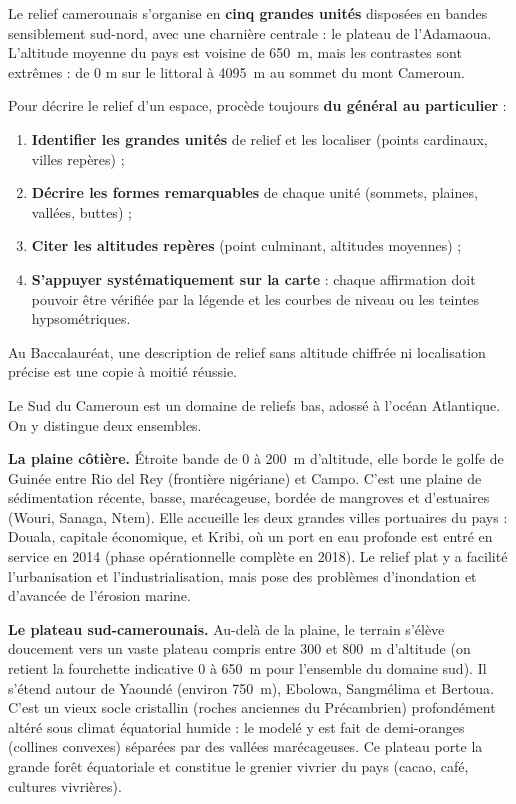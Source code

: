 \documentclass[11pt]{article}
\newcommand{\cle}[1]{{\popxbold\color{popdark}#1}}
\newcounter{popsec}
\newcounter{popsub}
\newcommand{\courssub}[1]{%
  \stepcounter{popsub}%
  \par\vspace{9pt}\noindent{\popxbold\fontsize{11.5}{13}\selectfont\color{popink}{\color{poporange}\thepopsec.\thepopsub}\hspace{6pt}#1}\par\nopagebreak\vspace{4pt}
}
\begin{document}
Le relief camerounais s'organise en \textbf{cinq grandes unités} disposées en bandes sensiblement sud-nord, avec une charnière centrale : le plateau de l'Adamaoua. L'altitude moyenne du pays est voisine de \SI{650}{m}, mais les contrastes sont extrêmes : de 0 m sur le littoral à \SI{4095}{m} au sommet du mont Cameroun.

\begin{methode}
Pour décrire le relief d'un espace, procède toujours \textbf{du général au particulier} :
\begin{enumerate}
\item \textbf{Identifier les grandes unités} de relief et les localiser (points cardinaux, villes repères) ;
\item \textbf{Décrire les formes remarquables} de chaque unité (sommets, plaines, vallées, buttes) ;
\item \textbf{Citer les altitudes repères} (point culminant, altitudes moyennes) ;
\item \textbf{S'appuyer systématiquement sur la carte} : chaque affirmation doit pouvoir être vérifiée par la légende et les courbes de niveau ou les teintes hypsométriques.
\end{enumerate}
Au Baccalauréat, une description de relief sans altitude chiffrée ni localisation précise est une copie à moitié réussie.
\end{methode}

\courssub{Les plaines et bas plateaux du Sud (0 à 650 m)}

Le Sud du Cameroun est un domaine de \cle{reliefs bas}, adossé à l'océan Atlantique. On y distingue deux ensembles.

\textbf{La plaine côtière.} Étroite bande de 0 à \SI{200}{m} d'altitude, elle borde le golfe de Guinée entre Rio del Rey (frontière nigériane) et Campo. C'est une plaine de \cle{sédimentation récente}, basse, marécageuse, bordée de mangroves et d'estuaires (Wouri, Sanaga, Ntem). Elle accueille les deux grandes villes portuaires du pays : \cle{Douala}, capitale économique, et \cle{Kribi}, où un port en eau profonde est entré en service en 2014 (phase opérationnelle complète en 2018). Le relief plat y a facilité l'urbanisation et l'industrialisation, mais pose des problèmes d'inondation et d'avancée de l'érosion marine.

\textbf{Le plateau sud-camerounais.} Au-delà de la plaine, le terrain s'élève doucement vers un vaste \cle{plateau} compris entre 300 et \SI{800}{m} d'altitude (on retient la fourchette indicative 0 à \SI{650}{m} pour l'ensemble du domaine sud). Il s'étend autour de \cle{Yaoundé} (environ \SI{750}{m}), \cle{Ebolowa}, \cle{Sangmélima} et \cle{Bertoua}. C'est un vieux socle cristallin (roches anciennes du Précambrien) profondément altéré sous climat équatorial humide : le modelé y est fait de \cle{demi-oranges} (collines convexes) séparées par des vallées marécageuses. Ce plateau porte la grande forêt équatoriale et constitue le grenier vivrier du pays (cacao, café, cultures vivrières).
\end{document}
